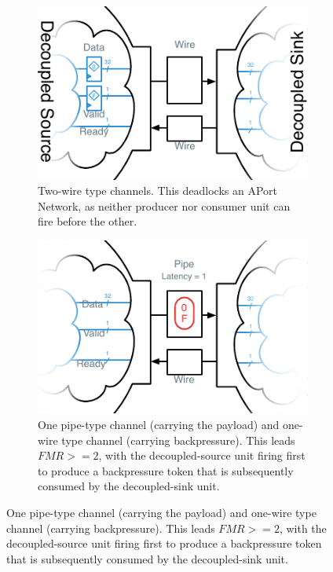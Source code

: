 \begin{figure}
    \centering
    \begin{subfigure}[t]{0.49\textwidth}
        \captionsetup{margin=0.25cm}
        \includegraphics[width=\columnwidth]{figures/li-wire-channel-manual.pdf}
        \caption{Two-wire type channels. This deadlocks an APort Network, as neither producer nor consumer unit can fire
        before the other.}
    \end{subfigure}
    \begin{subfigure}[t]{0.49\textwidth}
        \captionsetup{margin=0.25cm}
        \includegraphics[width=\columnwidth]{figures/li-pipe-channel-manual.pdf}
        \caption{One pipe-type channel (carrying the payload) and one-wire type channel (carrying backpressure). This leads $FMR >= 2$, with the decoupled-source unit
        firing first to produce a backpressure token that is subsequently consumed by the decoupled-sink unit.}

\end{subfigure}
\end{figure}
